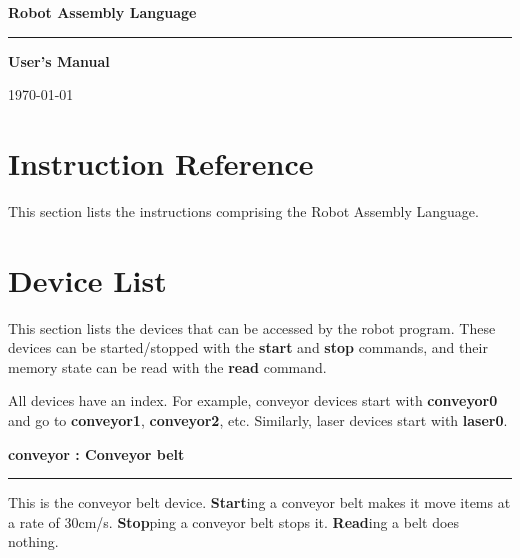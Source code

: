 \documentclass[12pt,a4paper]{article}
\begin{document}
\pagestyle{fancy}
\fancyhead{}
\fancyfoot[C]{\noindent\rule{\textwidth}{0.5pt}\par-\thepage-}

\begin{titlepage}
	\centering
	{\Huge\bfseries Robot Assembly Language\par}
	\vspace{1cm}
	\noindent\rule{\textwidth}{2pt}\par
	\vspace{4cm}
	{\Large\bfseries User's Manual\par}

	\vfill

	{\large \today\par}
\end{titlepage}

\tableofcontents
\pagebreak

\section{Instruction Reference}
This section lists the instructions comprising the Robot Assembly Language.
\pagebreak



\section{Device List}
This section lists the devices that can be accessed by the robot program. These devices can be started/stopped with the \textbf{start} and \textbf{stop} commands, and their memory state can be read with the \textbf{read} command.

All devices have an index. For example, conveyor devices start with \textbf{conveyor0} and go to \textbf{conveyor1}, \textbf{conveyor2}, etc. Similarly, laser devices start with \textbf{laser0}.
\pagebreak

\Huge\bfseries conveyor : \large Conveyor belt\par
\noindent\rule{ \textwidth }{2pt}\par
\vspace{ 0.5cm }
\mdseries\normalsize This is the conveyor belt device. \textbf{Start}ing a conveyor belt makes it move items at a rate of 30cm/s. \textbf{Stop}ping a conveyor belt stops it. \textbf{Read}ing a belt does nothing.
\end{document}
